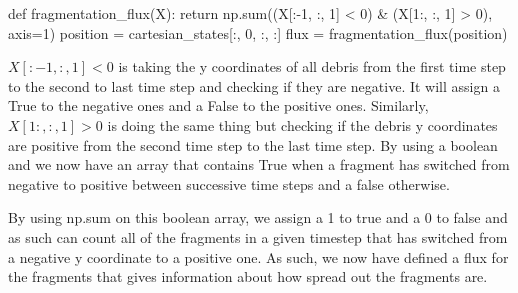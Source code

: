 \documentclass{article}
\newenvironment{code}{\captionsetup{type=listing}}{}
\begin{document}
\begin{code}
	\begin{tcbpythoncode}
		def fragmentation_flux(X):
			return np.sum((X[:-1, :, 1] < 0) & (X[1:, :, 1] > 0), axis=1)
		position = cartesian_states[:, 0, :, :]
		flux = fragmentation_flux(position)
	\end{tcbpythoncode}
\end{code}

$X[:-1, :, 1] < 0$ is taking the y coordinates of all debris from the first time step to the second to last time step and checking if they are negative. It will assign a True to the negative ones and a False to the positive ones. Similarly, $X[1:, :, 1] > 0$ is doing the same thing but checking if the debris y coordinates are positive from the second time step to the last time step. By using a boolean and we now have an array that contains True when a fragment has switched from negative to positive between successive time steps and a false otherwise.

By using np.sum on this boolean array, we assign a 1 to true and a 0 to false and as such can count all of the fragments in a given timestep that has switched from a negative y coordinate to a positive one. As such, we now have defined a flux for the fragments that gives information about how spread out the fragments are.
\end{document}
